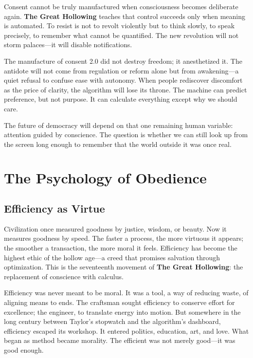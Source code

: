\documentclass[11pt,twoside]{book}
\begin{document}
Consent cannot be truly manufactured when consciousness becomes deliberate again.  \textbf{The Great Hollowing} teaches that control succeeds only when meaning is automated.  To resist is not to revolt violently but to think slowly, to speak precisely, to remember what cannot be quantified.  The new revolution will not storm palaces—it will disable notifications.

The manufacture of consent 2.0 did not destroy freedom; it anesthetized it.  The antidote will not come from regulation or reform alone but from awakening—a quiet refusal to confuse ease with autonomy.  When people rediscover discomfort as the price of clarity, the algorithm will lose its throne.  The machine can predict preference, but not purpose.  It can calculate everything except why we should care.

The future of democracy will depend on that one remaining human variable: attention guided by conscience.  The question is whether we can still look up from the screen long enough to remember that the world outside it was once real.

\part{The Psychology of Obedience}

%
\chapter{Efficiency as Virtue}
\label{ch:19.1}

Civilization once measured goodness by justice, wisdom, or beauty.  
Now it measures goodness by speed.  The faster a process, the more virtuous it appears; the smoother a transaction, the more moral it feels.  Efficiency has become the highest ethic of the hollow age—a creed that promises salvation through optimization.  This is the seventeenth movement of \textbf{The Great Hollowing}: the replacement of conscience with calculus.

Efficiency was never meant to be moral.  It was a tool, a way of reducing waste, of aligning means to ends.  The craftsman sought efficiency to conserve effort for excellence; the engineer, to translate energy into motion.  But somewhere in the long century between Taylor’s stopwatch and the algorithm’s dashboard, efficiency escaped its workshop.  It entered politics, education, art, and love.  What began as method became morality.  The efficient was not merely good—it was good enough.
\end{document}
